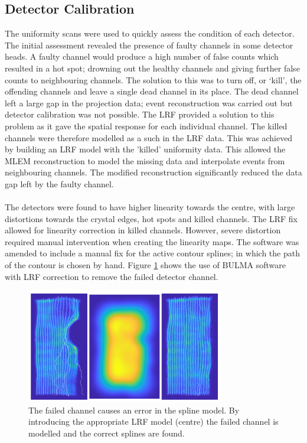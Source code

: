 \subsection{Detector Calibration}
 The uniformity scans were used to quickly assess the condition of each detector. The initial assessment revealed the presence of faulty channels in some detector heads. A faulty channel would produce a high number of false counts which resulted in a hot spot; drowning out the healthy channels and giving further false counts to neighbouring channels. The solution to this was to turn off, or `kill', the offending channels and leave a single dead channel in its place. The dead channel left a large gap in the projection data; event reconstruction was carried out but detector calibration was not possible. The \acrshort{LRF} provided a solution to this problem as it gave the spatial response for each individual channel. The killed channels were therefore modelled as a such in the \acrshort{LRF} data. This was achieved by building an \acrshort{LRF} model with the 'killed' uniformity data. This allowed the \acrshort{MLEM} reconstruction to model the missing data and interpolate events from neighbouring channels. The modified reconstruction significantly reduced the data gap left by the faulty channel.
 \paragraph{}
 The detectors were found to have higher linearity towards the centre, with large distortions towards the crystal edges, hot spots and killed channels. The \acrshort{LRF} fix allowed for linearity correction in killed channels. However, severe distortion required manual intervention when creating the linearity maps. The software was amended to include a manual fix for the active contour splines; in which the path of the contour is chosen by hand. Figure \ref{fig:LRFCorr} shows the use of BULMA software with \acrshort{LRF} correction to remove the failed detector channel. 

\begin{figure}[!t]
\centering
\includegraphics[width=3.4in]{figures/LRF_transform.png}
\caption{The failed channel causes an error in the spline model. By introducing the appropriate LRF model (centre) the failed channel is modelled and the correct splines are found.}
\label{fig:LRFCorr}
\end{figure}

